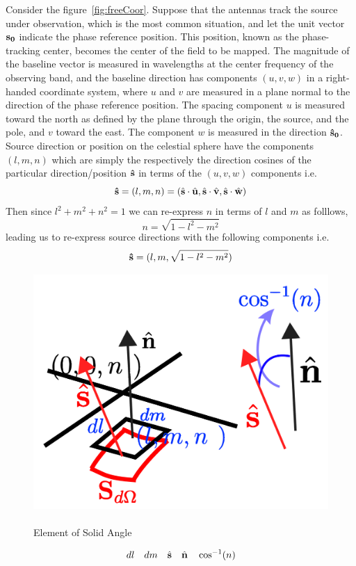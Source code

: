 Consider the figure~\ref{fig:freeCoor}.
Suppose that the antennas track the source under observation, which is the most common situation, and let the unit vector $\bf{s_0}$ indicate the phase reference position. This position, known as the phase-tracking center, becomes the center of the field to be mapped. The magnitude of the baseline vector is
measured in wavelengths at the center frequency of the observing band, and the baseline direction has components $(u, v , w)$ in a right-handed coordinate system, where $u$ and $v$ are measured in a plane normal to the direction of the phase reference position. The spacing component $u$ is measured toward the north as defined by
the plane through the origin, the source, and the pole, and $v$ toward the east. The component $w$ is measured in the direction ${\bf\hat{s}_0}$. Source direction or position on the celestial sphere have the components $(l,m,n)$ which are simply the respectively the direction cosines of the particular direction/position ${\bf \hat{s}}$ in terms of the $(u,v,w)$ components i.e. 
\begin{equation}
{\bf \hat{s}} = (l,m,n) = (\hat{\bf s}\cdot\hat{\bf u},\hat{\bf s}\cdot\hat{\bf v},\hat{\bf s}\cdot\hat{\bf w})
\end{equation}
Then since $l^2 + m^2 + n^2 = 1$ we can re-express $n$ in terms of $l$ and $m$ as folllows, 
\begin{equation}
n = \sqrt{1 - l^2 - m^2}
\end{equation}
leading us to re-express source directions with the following components i.e.
\begin{equation}
{\bf \hat{s}} = (l,m, \sqrt{1 - l^2 - m^2})
\end{equation}
\begin{figure}[htbp]
\center
    \includegraphics[scale= 0.5]{Figures/sAngle}
 	\caption[Element of Solid Angle]{\\Element of Solid Angle}
	\label{fig:sAngle}
\end{figure}
\begin{equation}
dl \quad dm \quad \hat{\bf s} \quad \hat{\bf n} \quad \cos^{-1}(n)
\end{equation}

